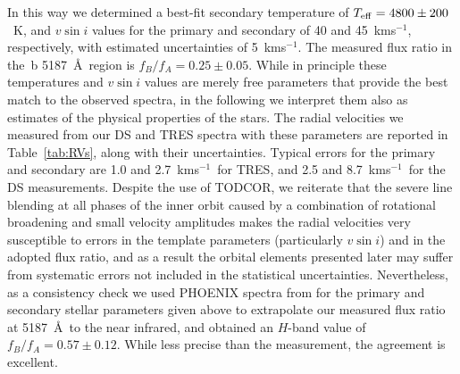 \documentclass[twocolumn]{aastex61}
\newcommand\kms{\ifmmode{\rm km\thinspace s^{-1}}\else km\thinspace s$^{-1}$\fi}
\begin{document}
In this way we determined a best-fit secondary temperature of $T_{\rm eff} = 4800 \pm 200$~K, and $v \sin i$ values for the primary and secondary of 40 and 45~\kms, respectively, with estimated uncertainties of 5~\kms. The measured flux ratio in the \,b 5187~\AA\ region is $f_B/f_A = 0.25 \pm 0.05$. While in principle these temperatures and $v \sin i$ values are merely free parameters that provide the best match to the observed spectra, in the following we interpret them also as estimates of the physical properties of the stars. The radial velocities we measured from our DS and TRES spectra with these parameters are reported in Table~\ref{tab:RVs}, along with their uncertainties.
Typical errors for the primary and secondary are 1.0 and 2.7~\kms\ for TRES, and 2.5 and 8.7~\kms\ for the DS measurements. Despite the use of TODCOR, we reiterate that the severe line blending at all phases of the inner orbit caused by a combination of rotational broadening and small velocity amplitudes makes the radial velocities very susceptible to errors in the template parameters (particularly $v \sin i$) and in the adopted flux ratio, and as a result the orbital elements presented later may suffer from systematic errors not included in the statistical uncertainties.
Nevertheless, as a consistency check we used PHOENIX spectra from \cite{husser13} for the primary and secondary stellar parameters given above to extrapolate our measured flux ratio at 5187~\AA\ to the near infrared, and obtained an $H$-band value of $f_B/f_A = 0.57 \pm 0.12$. While less precise than the \cite{berger11} measurement, the agreement is excellent.

\end{document}
